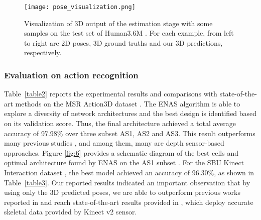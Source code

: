 \documentclass{bmvc2k}
\begin{document}
\begin{figure}[ht]
\begin{center}
 \texttt{[image: pose\_visualization.png]} 
 \vspace*{-0.5cm}
\end{center}
   \caption{Visualization of 3D output of the estimation stage with some samples on the test set of Human3.6M \cite{6682899}. For each example, from left to right are 2D poses, 3D ground truths and our 3D predictions, respectively.}
\label{fig:5}
\end{figure}
\subsubsection{Evaluation on action recognition \\[-0.1cm]}
Table~\ref{table2} reports the experimental results and comparisons with state-of-the-art methods on the MSR Action3D dataset \cite{li2010action}. The ENAS algorithm \cite{pmlr-v80-pham18a} is able to explore a diversity of network architectures and the best design is identified based on its validation score. Thus, the final architecture achieved a total average accuracy of 97.98\% over three subset AS1, AS2 and AS3. This result outperforms many previous studies \cite{li2010action,Chen2013RealtimeHA,Vemulapalli2014HumanAR,Du2015HierarchicalRN,Liu2016SpatioTemporalLW,Wang2016GraphBS,WengSpatioTemporalNN,Xu2015SpatioTemporalPM,lee2017ensemble}, and among them, many are depth sensor-based approaches. Figure \ref{fig:6} provides a schematic diagram of the best cells and optimal architecture found by ENAS on the AS1 subset \cite{li2010action}. For the SBU Kinect Interaction dataset \cite{yun2012two}, the best model achieved an accuracy of 96.30\%, as shown in Table~\ref{table3}. Our reported results indicated an important observation that by using only the 3D predicted poses, we are able to outperform previous works reported in \cite{Song2017AnES,Liu2016SpatioTemporalLW,8322204,ke2017new,DBLP:conf/bmvc/TasK18,Wang2017ModelingTD,liu2018skeleton} and reach state-of-the-art results provided in \cite{zhang2019view,s19081932}, which deploy accurate skeletal data provided by Kinect v2 sensor.
\end{document}

